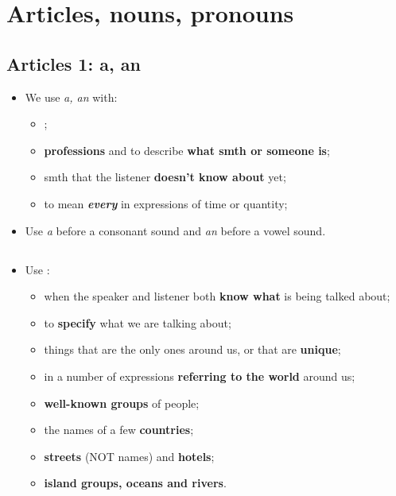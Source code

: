 \section{Articles, nouns, pronouns}

\subsection{Articles 1: a, an}
\begin{itemize}
    \item We use \textit{a, an} with:
    \begin{itemize}
        \item {};
        \item \textbf{professions} and to describe \textbf{what smth or someone is};
        \item smth that the listener \textbf{doesn't know about} yet;
        \item[\daash] to mean \textit{\textbf{every}} in expressions of time or quantity;
    \end{itemize}
    \item Use \textit{a} before a consonant sound and \textit{an} before a vowel sound.
\end{itemize}

\subsection{}
\begin{itemize}
    \item Use :
    \begin{itemize}
        \item when the speaker and listener both \textbf{know what} is being talked about;
        \item[\daash] to \textbf{specify} what we are talking about;
        \item things that are the only ones around us, or that are \textbf{unique};
        \item[\daash] in a number of expressions \textbf{referring to the world} around us;
        \item[\daash] \textbf{well-known groups} of people;
        \item[\daash] the names of a few \textbf{countries};
        \item \textbf{streets} (NOT names) and \textbf{hotels};
        \item[\daash] \textbf{island groups, oceans and rivers}.
    \end{itemize}
\end{itemize}

